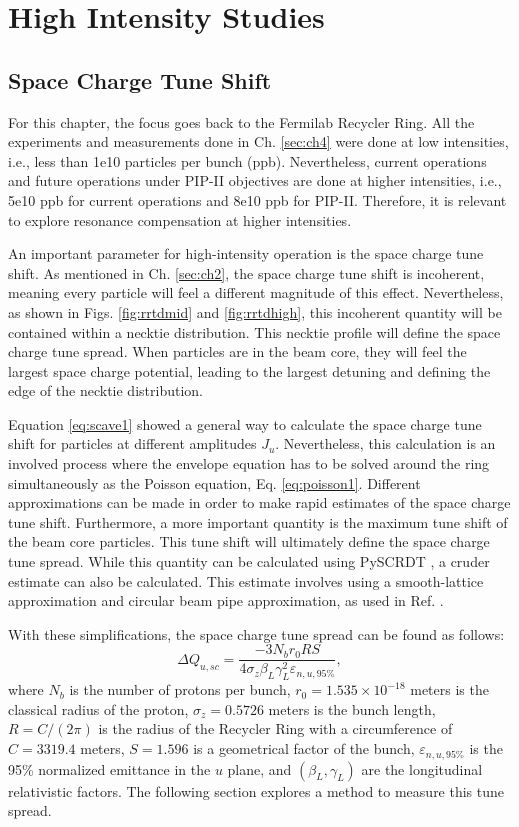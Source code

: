 \chapter{High Intensity Studies}
\label{sec:ch6}

\section{Space Charge Tune Shift}

For this chapter, the focus goes back to the Fermilab Recycler Ring. All the experiments and measurements done in Ch. \ref{sec:ch4} were done at low intensities, i.e., less than 1e10 particles per bunch (ppb). Nevertheless, current operations and future operations under PIP-II objectives are done at higher intensities, i.e., 5e10 ppb for current operations and 8e10 ppb for PIP-II. Therefore, it is relevant to explore resonance compensation at higher intensities. 

An important parameter for high-intensity operation is the space charge tune shift. As mentioned in Ch. \ref{sec:ch2}, the space charge tune shift is incoherent, meaning every particle will feel a different magnitude of this effect. Nevertheless, as shown in Figs. \ref{fig:rrtdmid} and \ref{fig:rrtdhigh}, this incoherent quantity will be contained within a necktie distribution. This necktie profile will define the space charge tune spread. When particles are in the beam core, they will feel the largest space charge potential, leading to the largest detuning and defining the edge of the necktie distribution.

Equation \ref{eq:scave1} showed a general way to calculate the space charge tune shift for particles at different amplitudes $J_u$. Nevertheless, this calculation is an involved process where the envelope equation has to be solved around the ring simultaneously as the Poisson equation, Eq. \ref{eq:poisson1}. Different approximations can be made in order to make rapid estimates of the space charge tune shift. Furthermore, a more important quantity is the maximum tune shift of the beam core particles. This tune shift will ultimately define the space charge tune spread. While this quantity can be calculated using PySCRDT \cite{scrdt_report}, a cruder estimate can also be calculated. This estimate involves using a smooth-lattice approximation and circular beam pipe approximation, as used in Ref. \cite{zhang}. 

With these simplifications, the space charge tune spread can be found as follows:
\begin{equation}
    \label{eq:tunesc}
    \Delta Q_{u,sc}=\frac{-3 N_b r_0 R S}{4 \sigma_z \beta_L \gamma_L ^2 \varepsilon_{n,u,95\%}},    
\end{equation}
where $N_b$ is the number of protons per bunch, $r_0=1.535\times 10^{-18}$ meters is the classical radius of the proton, $\sigma_z = 0.5726$ meters is the bunch length, $R = C/(2 \pi)$ is the radius of the Recycler Ring with a circumference of $C=3319.4$ meters, $S=1.596$ is a geometrical factor of the bunch, $\varepsilon_{n,u,95\%}$ is the 95\% normalized emittance in the $u$ plane, and $(\beta_L,\gamma_L)$ are the longitudinal relativistic factors. The following section explores a method to measure this tune spread.  

